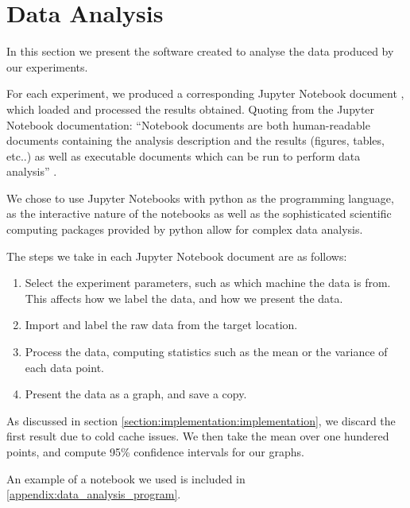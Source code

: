 \section{Data Analysis}
\label{section:experimental_methodology:data_analysis}

In this section we present the software created to analyse the data produced by our experiments.

For each experiment, we produced a corresponding Jupyter Notebook document \cite{project_jupyter}, which loaded and processed the results obtained. Quoting from the Jupyter Notebook documentation: ``Notebook documents are both human-readable documents containing the analysis description and the results (figures, tables, etc..) as well as executable documents which can be run to perform data analysis'' \cite{what_is_jupyter_notebook}.

We chose to use Jupyter Notebooks with python as the programming language, as the interactive nature of the notebooks as well as the sophisticated scientific computing packages provided by python allow for complex data analysis.

The steps we take in each Jupyter Notebook document are as follows:

\begin{enumerate}
    \item Select the experiment parameters, such as which machine the data is from. This affects how we label the data, and how we present the data.
    \item Import and label the raw data from the target location.
    \item Process the data, computing statistics such as the mean or the variance of each data point.
    \item Present the data as a graph, and save a copy.
\end{enumerate}

As discussed in section \ref{section:implementation:implementation}, we discard the first result due to cold cache issues. We then take the mean over one hundered points, and compute 95\% confidence intervals for our graphs.

An example of a notebook we used is included in \ref{appendix:data_analysis_program}.